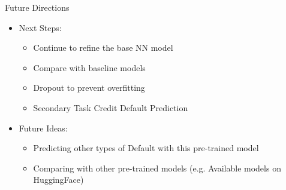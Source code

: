 \documentclass{beamer}
\begin{document}
\begin{frame}{Future Directions}

    \begin{itemize}
      \item Next Steps: 
        \begin{itemize}
          \item Continue to refine the base NN model 
          \item Compare with baseline models 
          \item Dropout to prevent overfitting
          \item Secondary Task Credit Default Prediction 
        \end{itemize}
      \item Future Ideas: 
        \begin{itemize}
          \item Predicting other types of Default with this pre-trained model 
          \item Comparing with other pre-trained models (e.g. Available models on HuggingFace)
        \end{itemize}
    \end{itemize}

\end{frame} 

\end{document}
